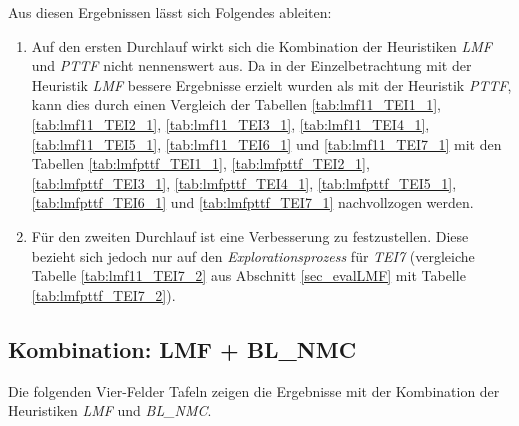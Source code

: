 \begin{multicols}{2}
\columnbreak
{}
\end{multicols}
\pagebreak
\noindent
Aus diesen Ergebnissen lässt sich Folgendes ableiten:
\begin{enumerate}
\item 
Auf den ersten Durchlauf wirkt sich die Kombination der \Gls{Heuristik}en \emph{LMF} und \emph{PTTF} nicht nennenswert aus.
Da in der Einzelbetrachtung mit der \Gls{Heuristik} \emph{LMF} bessere Ergebnisse erzielt wurden als mit der \Gls{Heuristik} \emph{PTTF}, kann dies durch einen Vergleich der Tabellen \ref{tab:lmf11_TEI1_1}, \ref{tab:lmf11_TEI2_1}, \ref{tab:lmf11_TEI3_1}, \ref{tab:lmf11_TEI4_1}, \ref{tab:lmf11_TEI5_1}, \ref{tab:lmf11_TEI6_1} und \ref{tab:lmf11_TEI7_1} mit den Tabellen \ref{tab:lmfpttf_TEI1_1}, \ref{tab:lmfpttf_TEI2_1}, \ref{tab:lmfpttf_TEI3_1}, \ref{tab:lmfpttf_TEI4_1}, \ref{tab:lmfpttf_TEI5_1}, \ref{tab:lmfpttf_TEI6_1} und \ref{tab:lmfpttf_TEI7_1} nachvollzogen werden.

\item 
Für den zweiten Durchlauf ist eine Verbesserung zu festzustellen. Diese bezieht sich jedoch nur auf den \emph{Explorationsprozess} für \emph{TEI7} (vergleiche Tabelle \ref{tab:lmf11_TEI7_2} aus Abschnitt \ref{sec_evalLMF} mit Tabelle \ref{tab:lmfpttf_TEI7_2}).
\end{enumerate}

\subsection{Kombination: LMF + BL\_NMC}\label{sec_evalLMFBLNMC}
Die folgenden Vier-Felder Tafeln zeigen die Ergebnisse mit der Kombination der \Gls{Heuristik}en \emph{LMF} und \emph{BL\_NMC}.
\begin{multicols}{3}
\columnbreak
{}\columnbreak
{}
\end{multicols}

\begin{multicols}{2}
\columnbreak
{}
\end{multicols}

